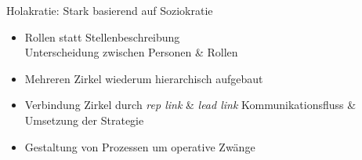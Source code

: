 \documentclass{cheatsheet}
\begin{document}
    \begin{sectionbox}{Holakratie: Stark basierend auf Soziokratie}
        \begin{itemize}
            \item Rollen statt Stellenbeschreibung\\
            \ra Unterscheidung zwischen Personen \& Rollen
            \item Mehreren Zirkel \ra wiederum hierarchisch aufgebaut
            \item Verbindung Zirkel durch \emph{rep link} \& \emph{lead link}
            \ra Kommunikationsfluss \& Umsetzung der Strategie
            \item Gestaltung von Prozessen um operative Zwänge
        \end{itemize}
    \end{sectionbox}   
\end{document}
